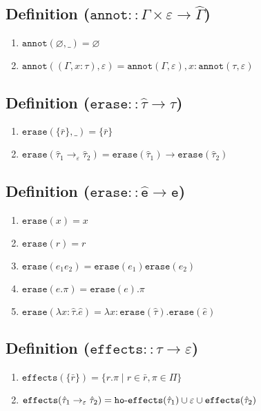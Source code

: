 \documentclass{llncs}
\newcommand{\keywadj}[1]{\mathtt{#1}}
\newcommand{\kwa}[1]{\keywadj{ #1 }}
\newcommand{\hyphen}{\hbox{-}}
\begin{document}
\subsection*{Definition ($\kwa{annot :: \Gamma \times \varepsilon \rightarrow \hat \Gamma}$)}

\begin{enumerate}
	\item $\kwa{annot}(\varnothing, \_) = \varnothing$
	\item $\kwa{annot}((\Gamma, x: \tau), \varepsilon) = \kwa{annot}(\Gamma, \varepsilon), x: \kwa{annot}(\tau, \varepsilon)$
\end{enumerate}

\subsection*{Definition ($\kwa{erase :: \hat \tau \rightarrow \tau}$)}

\begin{enumerate}
	\item $\kwa{erase}(\{ \bar r \}, \_) = \{ \bar r \}$
	\item $\kwa{erase}(\hat \tau_1 \rightarrow_{\varepsilon} \hat \tau_2) = \kwa{erase}(\hat \tau_1) \rightarrow \kwa{erase}(\hat \tau_2)$
\end{enumerate}

\subsection*{Definition ($\kwa{erase :: \hat e \rightarrow e}$)}

\begin{enumerate}
	\item $\kwa{erase}(x) = x$
	\item $\kwa{erase}(r) = r$
	\item $\kwa{erase}(e_1 e_2) = \kwa{erase}(e_1) \kwa{erase}(e_2)$
	\item $\kwa{erase}(e.\pi) = \kwa{erase}(e).\pi$
	\item $\kwa{erase}(\lambda x: \hat \tau.\hat e) = \lambda x: \kwa{erase}(\hat \tau).\kwa{erase}(\hat e)$
\end{enumerate}

\subsection*{Definition ($\kwa{effects :: \tau \rightarrow \varepsilon}$)}

\begin{enumerate}
	\item $\kwa{effects}(\{ \bar r \}) = \{ r.\pi \mid r \in \bar r, \pi \in \Pi \}$
	\item $\kwa{effects}(\hat \tau_1 \rightarrow_{\varepsilon} \hat \tau_2) = \kwa{ho \hyphen effects}(\hat \tau_1) \cup \varepsilon \cup \kwa{effects}(\hat \tau_2)$
\end{enumerate}
\end{document}
